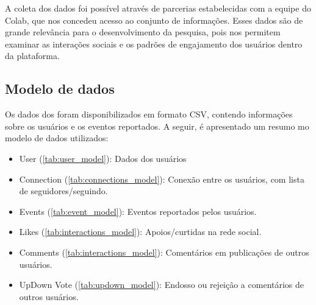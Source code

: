 A coleta dos dados foi possível através de parcerias estabelecidas com a equipe do Colab, que nos concedeu acesso ao conjunto de informações. Esses dados são de grande relevância para o desenvolvimento da pesquisa, pois nos permitem examinar as interações sociais e os padrões de engajamento dos usuários dentro da plataforma.

\subsection*{Modelo de dados}
\label{sec:modelo_de_dados}

Os dados dos foram disponibilizados em formato CSV, contendo informações sobre os usuários e os eventos reportados. A seguir, é apresentado um resumo mo modelo de dados utilizados:

\begin{itemize}
	\item User (\autoref{tab:user_model}): Dados dos usuários
	\item Connection (\autoref{tab:connections_model}): Conexão entre os usuários, com lista de seguidores/seguindo.
	\item Events (\autoref{tab:event_model}): Eventos reportados pelos usuários.
	\item Likes (\autoref{tab:interactions_model}): Apoios/curtidas na rede social.
	\item Comments (\autoref{tab:interactions_model}): Comentários em publicações de outros usuários.
	\item UpDown Vote (\autoref{tab:updown_model}): Endosso ou rejeição a comentários de outros usuários.
\end{itemize}

